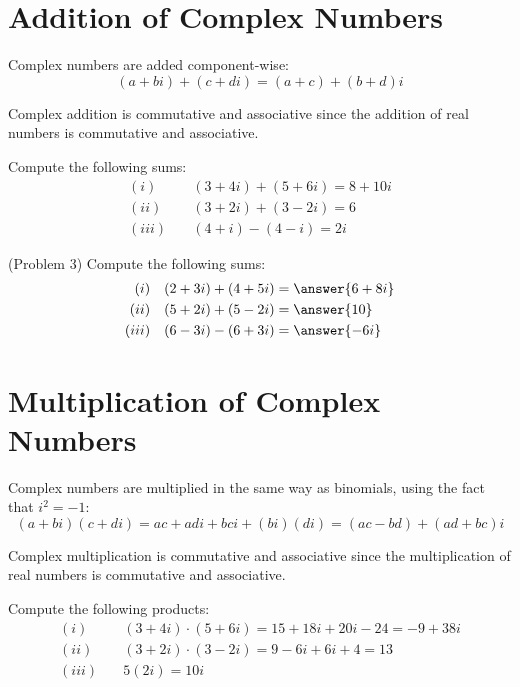 \documentclass[handout]{ximera}
\begin{document}
\section{Addition of Complex Numbers}

Complex numbers are added component-wise:
\[
(a+bi) + (c+di) = (a+c) + (b+d)i
\]

Complex addition is commutative and associative since the addition of real numbers is commutative and associative.

\begin{example}[Example 3]
Compute the following sums:
\begin{align*}
(i)& \quad (3+4i) + (5+6i) = 8+10i \\
(ii)& \quad (3+2i) + (3-2i) = 6 \\
(iii)& \quad (4+i) - (4-i) = 2i
\end{align*}

\end{example}


\begin{problem}(Problem 3)
Compute the following sums:
\begin{align*}
(i)& \quad (2+3i) + (4+5i) = \answer{6+8i} \\
(ii)& \quad(5+2i) + (5-2i) = \answer{10}\\
(iii)& \quad(6-3i) - (6+3i) = \answer{-6i}
\end{align*}
\end{problem}

\section{Multiplication of Complex Numbers}
Complex numbers are multiplied in the same way as binomials, using the fact that $i^2 = -1$:
\[
(a+bi)(c+di) = ac + adi + bci + (bi)(di) = (ac-bd) + (ad+bc)i
\]

Complex multiplication is commutative and associative since the multiplication of real numbers is commutative and associative.

\begin{example}[Example 4]
Compute the following products:
\begin{align*}
(i)& \quad (3+4i) \cdot (5+6i) = 15 + 18i + 20i - 24 = -9 + 38i \\
(ii)& \quad (3+2i) \cdot (3-2i) = 9-6i+6i+4=13 \\
(iii)& \quad 5(2i) = 10i
\end{align*}

\end{example}
\end{document}
